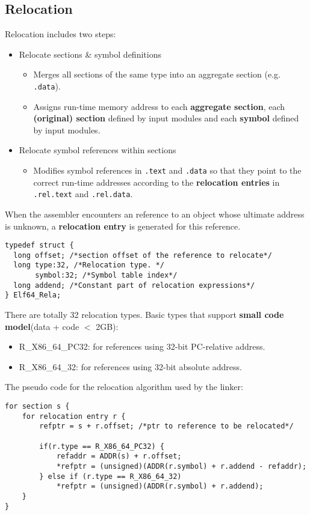 \subsection{Relocation}
Relocation includes two steps:
\begin{itemize}
\item Relocate sections \& symbol definitions
	\begin{itemize}
	\item Merges all sections of the same type into an aggregate section (e.g. \texttt{.data}). 
	\item Assigns run-time memory address to each \textbf{aggregate section}, each \textbf{(original) section} defined by input modules and each \textbf{symbol} defined by input modules.
	\end{itemize}
\item Relocate symbol references within sections
	\begin{itemize}
		\item Modifies symbol references in \texttt{.text} and \texttt{.data} so that they point to the correct run-time addresses according to the \textbf{relocation entries} in \texttt{.rel.text} and \texttt{.rel.data}. 
	\end{itemize}
\end{itemize}
When the assembler encounters an reference to an object whose ultimate address is unknown, a \textbf{relocation entry} is generated for this reference.
\begin{lstlisting}
typedef struct {
  long offset; /*section offset of the reference to relocate*/
  long type:32, /*Relocation type. */
       symbol:32; /*Symbol table index*/
  long addend; /*Constant part of relocation expressions*/
} Elf64_Rela;
\end{lstlisting}
There are totally 32 relocation types. Basic types that support \textbf{small code model}(data + code $<$ 2GB):
\begin{itemize}
\item R\_X86\_64\_PC32: for references using 32-bit PC-relative address.
\item R\_X86\_64\_32: for references using 32-bit absolute address.
\end{itemize}
The pseudo code for the relocation algorithm used by the linker: 
\begin{lstlisting}
for section s {
	for relocation entry r {
		refptr = s + r.offset; /*ptr to reference to be relocated*/

		if(r.type == R_X86_64_PC32) {
			refaddr = ADDR(s) + r.offset;
			*refptr = (unsigned)(ADDR(r.symbol) + r.addend - refaddr);
		} else if (r.type == R_X86_64_32)
			*refptr = (unsigned)(ADDR(r.symbol) + r.addend);
	}
}
\end{lstlisting}
\ifx\PREAMBLE\undefined

\fi